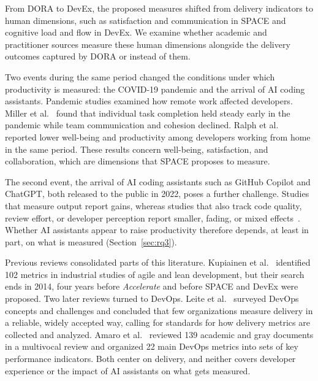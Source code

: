 \documentclass[preprint,number]{elsarticle}
\begin{document}
From DORA to DevEx, the proposed measures shifted from delivery indicators to human dimensions, such as satisfaction and communication in SPACE and cognitive load and flow in DevEx. We examine whether academic and practitioner sources measure these human dimensions alongside the delivery outcomes captured by DORA or instead of them.

Two events during the same period changed the conditions under which productivity is measured: the COVID-19 pandemic and the arrival of AI coding assistants. Pandemic studies examined how remote work affected developers. Miller et al.~\cite{P1503} found that individual task completion held steady early in the pandemic while team communication and cohesion declined. Ralph et al.~\cite{ralph2020pandemic} reported lower well-being and productivity among developers working from home in the same period. These results concern well-being, satisfaction, and collaboration, which are dimensions that SPACE proposes to measure.

The second event, the arrival of AI coding assistants such as GitHub Copilot and ChatGPT, both released to the public in 2022, poses a further challenge. Studies that measure output report gains, whereas studies that also track code quality, review effort, or developer perception report smaller, fading, or mixed effects~\cite{P2029, P2032, P0244}. Whether AI assistants appear to raise productivity therefore depends, at least in part, on what is measured (Section~\ref{sec:rq3}).

Previous reviews consolidated parts of this literature. Kupiainen et al.~\cite{kupiainen2015metrics} identified 102 metrics in industrial studies of agile and lean development, but their search ends in 2014, four years before \textit{Accelerate} and before SPACE and DevEx were proposed. Two later reviews turned to DevOps. Leite et al.~\cite{leite2019devops} surveyed DevOps concepts and challenges and concluded that few organizations measure delivery in a reliable, widely accepted way, calling for standards for how delivery metrics are collected and analyzed. Amaro et al.~\cite{amaro2024devops} reviewed 139 academic and gray documents in a multivocal review and organized 22 main DevOps metrics into sets of key performance indicators. Both center on delivery, and neither covers developer experience or the impact of AI assistants on what gets measured.
\end{document}
